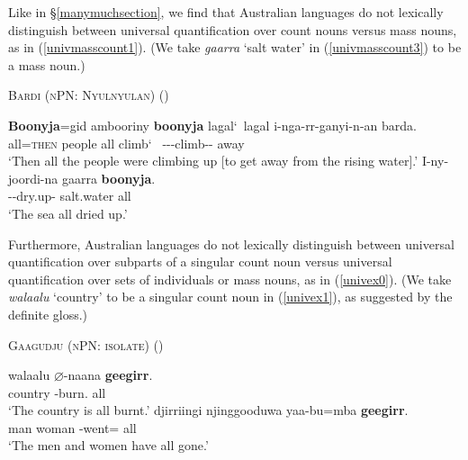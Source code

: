 \documentclass[12pt,egregdoesnotlikesansseriftitles]{scrartcl}
\begin{document}
Like in \S\ref{manymuchsection}, we find that Australian languages do not lexically distinguish between universal quantification over count nouns versus mass nouns, as in (\ref{univmasscount1}). (We take \textit{gaarra} `salt water' in (\ref{univmasscount3}) to be a mass noun.)
\begin{exe}
  \ex \textsc{Bardi (nPN: Nyulnyulan)} \hfill(\citealt{bowern12}) \label{univmasscount1}
  \begin{xlist}
    \ex %
    \gll \textbf{Boonyja}=gid ambooriny \textbf{boonyja} lagal\char`~lagal i-nga-rr-ganyi-n-an barda.\\
    all=\textsc{then} people all climb\char`~\Rdp{}  \Third-\Pst-\Aug-climb-\Cont-\Rempst{} away\\
    \glt `Then all the people were climbing up [to get away from the rising water].'\label{univmasscount2}
    \ex \gll I-ny-joordi-na gaarra \textbf{boonyja}.\\
    \Third\M-\Pst-dry.up-\Rempst{} salt.water all\\
    \glt `The sea all dried up.'\label{univmasscount3} %
  \end{xlist}
\end{exe}

Furthermore,  Australian languages  do not lexically distinguish between universal quantification  over subparts of a singular count noun versus universal quantification over sets of individuals or mass nouns, as in (\ref{univex0}). (We take \textit{walaalu} `country' to be a singular count noun in (\ref{univex1}), as suggested by the definite gloss.)
\begin{exe}
 \ex \textsc{Gaagudju (nPN: isolate)} \hfill (\citealt[307]{harvey92}) \label{univex0}
  \begin{xlist}
      \ex \gll walaalu $\varnothing$-naana \textbf{geegirr}.\\
    country \Cliv-burn.\Pp{} all\\
    \glt `The country is all burnt.' \label{univex1}
    \ex \gll djirriingi njinggooduwa yaa-bu=mba \textbf{geegirr}.\\
    man woman \Third\Cli-went=\Aug{} all\\
    \glt `The men and women have all gone.' \label{univex2}
  \end{xlist}
\end{exe}
\end{document}
